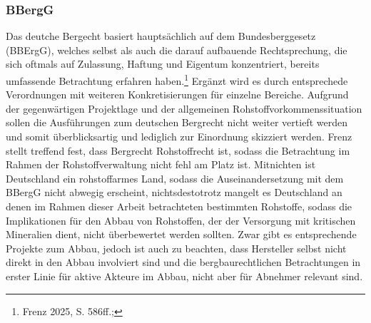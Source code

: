 \documentclass[12pt,a4paper,oneside]{book} %
\begin{document}
\subsubsection{BBergG}
Das deutche Bergecht basiert hauptsächlich auf dem Bundesberggesetz (BBErgG), welches selbst als auch die darauf aufbauende Rechtsprechung, die sich oftmals auf Zulassung, Haftung und Eigentum konzentriert, bereits umfassende Betrachtung erfahren haben.\footnote{Frenz 2025, S. 586ff.;} Ergänzt wird es durch entsprechede Verordnungen mit weiteren Konkretisierungen für einzelne Bereiche. Aufgrund der gegenwärtigen Projektlage und der allgemeinen Rohstoffvorkommenssituation sollen die Ausführungen zum deutschen Bergrecht nicht weiter vertieft werden und somit überblicksartig und lediglich zur Einordnung skizziert werden. Frenz stellt treffend fest, dass Bergrecht Rohstoffrecht ist,\autocite{Frenz 2025, S. 621} sodass die Betrachtung im Rahmen der Rohstoffverwaltung nicht fehl am Platz ist. Mitnichten ist Deutschland ein rohstoffarmes Land, sodass die Auseinandersetzung mit dem BBergG nicht abwegig erscheint, nichtsdestotrotz mangelt es Deutschland an denen im Rahmen dieser Arbeit betrachteten bestimmten Rohstoffe, sodass die Implikationen für den Abbau von Rohstoffen, der der Versorgung mit kritischen Mineralien dient, nicht überbewertet werden sollten. Zwar gibt es entsprechende Projekte zum Abbau, jedoch ist auch zu beachten, dass Hersteller selbst nicht direkt in den Abbau involviert sind und die bergbaurechtlichen Betrachtungen in erster Linie für aktive Akteure im Abbau, nicht aber für Abnehmer relevant sind.
\end{document}
